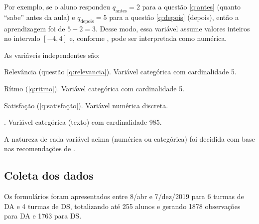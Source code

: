 Por exemplo, se o aluno respondeu $q_\text{antes} = 2$ para a questão \ref{q:antes} (quanto ``sabe'' antes da aula) e $q_\text{depois} = 5$ para a questão \ref{q:depois} (depois), então a aprendizagem foi de $5 - 2 = 3$.
Desse modo, essa variável assume valores inteiros no intervalo $[-4,4]$ e, conforme \cite{Harpe2015}, pode ser interpretada como numérica.

As variáveis independentes são:
\begin{compactitem}
	\item Relevância (questão \ref{q:relevancia}).
	Variável categórica com cardinalidade 5.

	\item Rítmo (\ref{q:ritmo}).
	Variável categórica com cardinalidade 5.

	\item Satisfação (\ref{q:satisfação}).
	Variável numérica discreta.

	\item {}.
	Variável categórica (texto) com cardinalidade 985.
\end{compactitem}

A natureza de cada variável acima (numérica ou categórica) foi decidida com base nas recomendações de \cite{Harpe2015}.

\subsection{Coleta dos dados}

Os formulários foram apresentados entre 8/abr e 7/dez/2019 para 6 turmas de DA e 4 turmas de DS, totalizando até 255 alunos e gerando 1878 observações para DA e 1763 para DS.
